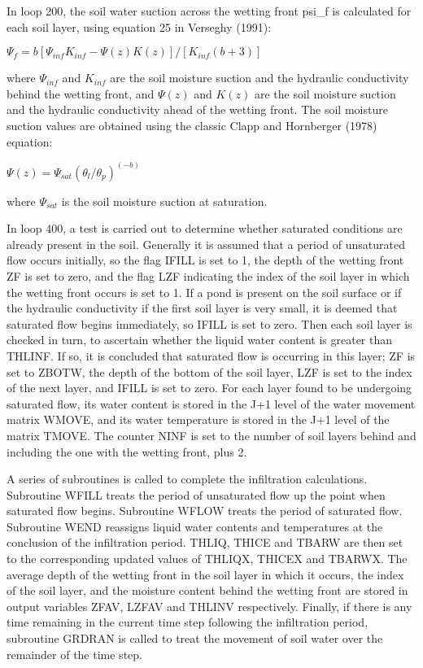 In loop 200, the soil water suction across the wetting front psi\+\_\+f is calculated for each soil layer, using equation 25 in Verseghy (1991)\+:

$\Psi_f = b[\Psi_{inf} K_{inf} - \Psi(z) K(z)]/[K_{inf} (b+3)]$

where $\Psi_{inf}$ and $K_{inf}$ are the soil moisture suction and the hydraulic conductivity behind the wetting front, and $\Psi(z)$ and $K(z)$ are the soil moisture suction and the hydraulic conductivity ahead of the wetting front. The soil moisture suction values are obtained using the classic Clapp and Hornberger (1978) equation\+:

$\Psi(z) = \Psi_{sat} (\theta_l / \theta_p )^{(-b)}$

where $\Psi_{sat}$ is the soil moisture suction at saturation.

In loop 400, a test is carried out to determine whether saturated conditions are already present in the soil. Generally it is assumed that a period of unsaturated flow occurs initially, so the flag I\+F\+I\+L\+L is set to 1, the depth of the wetting front Z\+F is set to zero, and the flag L\+Z\+F indicating the index of the soil layer in which the wetting front occurs is set to 1. If a pond is present on the soil surface or if the hydraulic conductivity if the first soil layer is very small, it is deemed that saturated flow begins immediately, so I\+F\+I\+L\+L is set to zero. Then each soil layer is checked in turn, to ascertain whether the liquid water content is greater than T\+H\+L\+I\+N\+F. If so, it is concluded that saturated flow is occurring in this layer; Z\+F is set to Z\+B\+O\+T\+W, the depth of the bottom of the soil layer, L\+Z\+F is set to the index of the next layer, and I\+F\+I\+L\+L is set to zero. For each layer found to be undergoing saturated flow, its water content is stored in the J+1 level of the water movement matrix W\+M\+O\+V\+E, and its water temperature is stored in the J+1 level of the matrix T\+M\+O\+V\+E. The counter N\+I\+N\+F is set to the number of soil layers behind and including the one with the wetting front, plus 2.

A series of subroutines is called to complete the infiltration calculations. Subroutine W\+F\+I\+L\+L treats the period of unsaturated flow up the point when saturated flow begins. Subroutine W\+F\+L\+O\+W treats the period of saturated flow. Subroutine W\+E\+N\+D reassigns liquid water contents and temperatures at the conclusion of the infiltration period. T\+H\+L\+I\+Q, T\+H\+I\+C\+E and T\+B\+A\+R\+W are then set to the corresponding updated values of T\+H\+L\+I\+Q\+X, T\+H\+I\+C\+E\+X and T\+B\+A\+R\+W\+X. The average depth of the wetting front in the soil layer in which it occurs, the index of the soil layer, and the moisture content behind the wetting front are stored in output variables Z\+F\+A\+V, L\+Z\+F\+A\+V and T\+H\+L\+I\+N\+V respectively. Finally, if there is any time remaining in the current time step following the infiltration period, subroutine G\+R\+D\+R\+A\+N is called to treat the movement of soil water over the remainder of the time step.